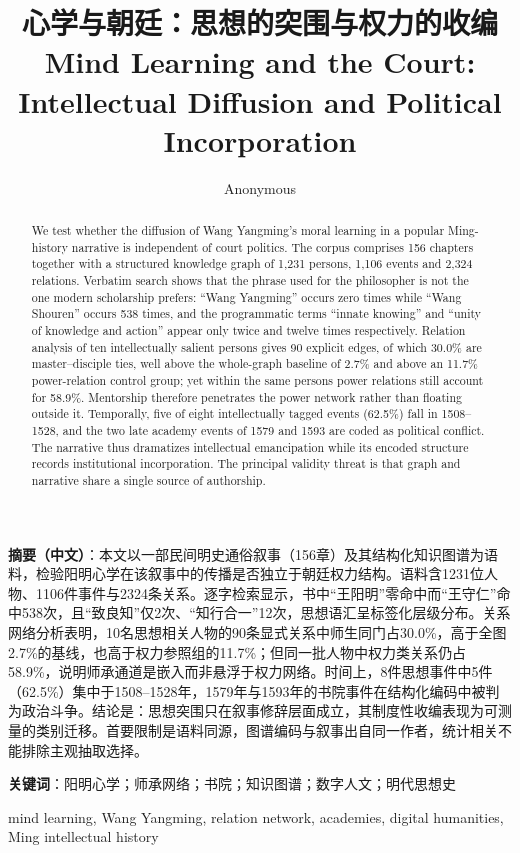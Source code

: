 \documentclass[conference]{IEEEtran}
\title{心学与朝廷：思想的突围与权力的收编\\[2pt]
\large Mind Learning and the Court: Intellectual Diffusion and Political Incorporation}
\author{Anonymous}
\date{}
\begin{document}
\maketitle

\noindent\textbf{摘要（中文）}：本文以一部民间明史通俗叙事（156章）及其结构化知识图谱为语料，检验阳明心学在该叙事中的传播是否独立于朝廷权力结构。语料含1231位人物、1106件事件与2324条关系。逐字检索显示，书中“王阳明”零命中而“王守仁”命中538次，且“致良知”仅2次、“知行合一”12次，思想语汇呈标签化层级分布。关系网络分析表明，10名思想相关人物的90条显式关系中师生同门占30.0\%，高于全图2.7\%的基线，也高于权力参照组的11.7\%；但同一批人物中权力类关系仍占58.9\%，说明师承通道是嵌入而非悬浮于权力网络。时间上，8件思想事件中5件（62.5\%）集中于1508--1528年，1579年与1593年的书院事件在结构化编码中被判为政治斗争。结论是：思想突围只在叙事修辞层面成立，其制度性收编表现为可测量的类别迁移。首要限制是语料同源，图谱编码与叙事出自同一作者，统计相关不能排除主观抽取选择。

\noindent\textbf{关键词}：阳明心学；师承网络；书院；知识图谱；数字人文；明代思想史

\vspace{6pt}
\begin{abstract}
We test whether the diffusion of Wang Yangming's moral learning in a popular Ming-history narrative is independent of court politics. The corpus comprises 156 chapters together with a structured knowledge graph of 1,231 persons, 1,106 events and 2,324 relations. Verbatim search shows that the phrase used for the philosopher is not the one modern scholarship prefers: ``Wang Yangming'' occurs zero times while ``Wang Shouren'' occurs 538 times, and the programmatic terms ``innate knowing'' and ``unity of knowledge and action'' appear only twice and twelve times respectively. Relation analysis of ten intellectually salient persons gives 90 explicit edges, of which 30.0\% are master--disciple ties, well above the whole-graph baseline of 2.7\% and above an 11.7\% power-relation control group; yet within the same persons power relations still account for 58.9\%. Mentorship therefore penetrates the power network rather than floating outside it. Temporally, five of eight intellectually tagged events (62.5\%) fall in 1508--1528, and the two late academy events of 1579 and 1593 are coded as political conflict. The narrative thus dramatizes intellectual emancipation while its encoded structure records institutional incorporation. The principal validity threat is that graph and narrative share a single source of authorship.
\end{abstract}

\begin{IEEEkeywords}
mind learning, Wang Yangming, relation network, academies, digital humanities, Ming intellectual history
\end{IEEEkeywords}











\end{document}
